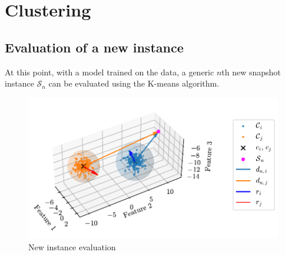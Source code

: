 \chapter{Clustering}

\section{Evaluation of a new instance}

At this point, with a model trained on the data, a generic $n$th new snapshot instance $\mathcal{S}_n$ can be evaluated using the K-means algorithm.


\begin{figure}[htbp]
  \centering
  \includegraphics[width=\textwidth]{images/Spheres_2.pdf}
\caption{New instance evaluation}
\label{fig:clust_spheres}
\end{figure}